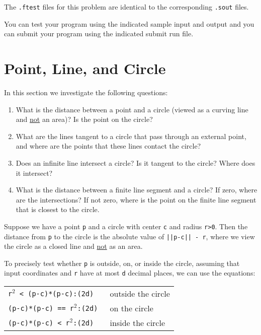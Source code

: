\documentclass[12pt]{article}
\begin{document}
The {\tt .ftest} files for this problem are identical
to the corresponding {\tt .sout} files.

You can test your program using the indicated sample input and
output and you can submit your program using the indicated submit
run file.

\newpage


\section{Point, Line, and Circle}
In this section we investigate the following questions:
\begin{enumerate}
\item What is the distance between a point and a circle (viewed as
a curving line and \underline{not} an area)?
Is the point on the circle?
\item What are the lines tangent to a circle that pass through
an external point, and where are the points that these lines contact the
circle?
\item Does an infinite line intersect a circle?  Is it
tangent to the circle?  Where does it intersect?
\item What is the distance between a finite line segment and
a circle?  If zero, where are the intersections?  If not zero,
where is the point on the finite line segment that is closest to the
circle.
\end{enumerate}

Suppose we have a point {\tt p} and a circle with center {\tt c}
and radius {\tt r>0}.  Then the distance from {\tt p} to the circle
is the absolute value of {\tt ||p-c|| - r},
where we view the circle as a closed line
and \underline{not} as an area.

To precisely test whether {\tt p} is outside, on, or inside the
circle, assuming that input coordinates and {\tt r} have at most
{\tt d} decimal places, we can use the equations:
\begin{center}
\begin{tabular}{l@{~~~~~}l}
\tt r$^2$ < (p-c)*(p-c):(2d) & outside the circle \\
\tt (p-c)*(p-c) == r$^2$:(2d) & on the circle \\
\tt (p-c)*(p-c) < r$^2$:(2d) & inside the circle \\
\end{tabular}
\end{center}
\end{document}
